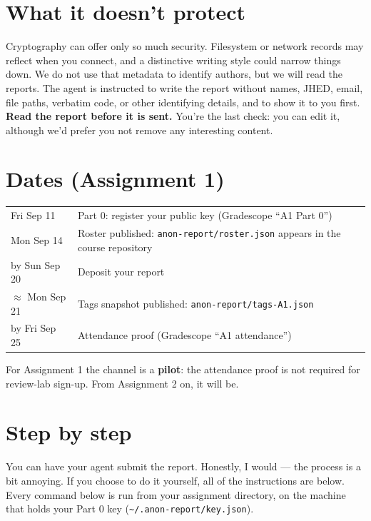 \documentclass[11pt]{article}
\newcommand{\file}[1]{\texttt{#1}}
\begin{document}
\section*{What it doesn't protect}

Cryptography can offer only so much security. Filesystem or network records may
reflect when you connect, and a distinctive writing style could narrow things down.
We do not use that metadata to identify authors, but we will read the reports.
The agent is instructed to write the report
without names, JHED, email, file paths, verbatim code, or other identifying details,
and to show it to you first. \textbf{Read the report before it is sent.} You're the
last check: you can edit it, although we'd prefer you not remove any interesting content.

\section*{Dates (Assignment 1)}

\begin{center}\small
\begin{tabular}{ll}
\toprule
Fri Sep 11 & Part 0: register your public key (Gradescope ``A1 Part 0'') \\
Mon Sep 14 & Roster published: \file{anon-report/roster.json} appears in the course repository \\
by Sun Sep 20 & Deposit your report \\
$\approx$ Mon Sep 21 & Tags snapshot published: \file{anon-report/tags-A1.json} \\
by Fri Sep 25 & Attendance proof (Gradescope ``A1 attendance'') \\
\bottomrule
\end{tabular}
\end{center}
For Assignment 1 the channel is a \textbf{pilot}: the attendance proof is not required
for review-lab sign-up. From Assignment 2 on, it will be.

\section*{Step by step}

You can have your agent submit the report. Honestly, I would --- the process is a bit annoying. If you choose to do it yourself, all of the 
instructions are below.  
Every command below is run from your assignment directory, on the machine that holds
your Part 0 key (\file{\textasciitilde/.anon-report/key.json}).
\end{document}
